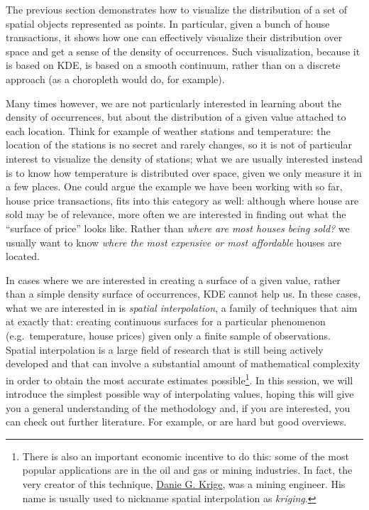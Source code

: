 \documentclass[]{book}
\begin{document}
The previous section demonstrates how to visualize the distribution of a
set of spatial objects represented as points. In particular, given a
bunch of house transactions, it shows how one can effectively visualize
their distribution over space and get a sense of the density of
occurrences. Such visualization, because it is based on KDE, is based on
a smooth continuum, rather than on a discrete approach (as a choropleth
would do, for example).

Many times however, we are not particularly interested in learning about
the density of occurrences, but about the distribution of a given value
attached to each location. Think for example of weather stations and
temperature: the location of the stations is no secret and rarely
changes, so it is not of particular interest to visualize the density of
stations; what we are usually interested instead is to know how
temperature is distributed over space, given we only measure it in a few
places. One could argue the example we have been working with so far,
house price transactions, fits into this category as well: although
where house are sold may be of relevance, more often we are interested
in finding out what the ``surface of price'' looks like. Rather than
\emph{where are most houses being sold?} we usually want to know
\emph{where the most expensive or most affordable} houses are located.

In cases where we are interested in creating a surface of a given value,
rather than a simple density surface of occurrences, KDE cannot help us.
In these cases, what we are interested in is \emph{spatial
interpolation}, a family of techniques that aim at exactly that:
creating continuous surfaces for a particular phenomenon
(e.g.~temperature, house prices) given only a finite sample of
observations. Spatial interpolation is a large field of research that is
still being actively developed and that can involve a substantial amount
of mathematical complexity in order to obtain the most accurate
estimates possible\footnote{There is also an important economic
  incentive to do this: some of the most popular applications are in the
  oil and gas or mining industries. In fact, the very creator of this
  technique, \href{https://en.wikipedia.org/wiki/Danie_G._Krige}{Danie
  G. Krige}, was a mining engineer. His name is usually used to nickname
  spatial interpolation as \emph{kriging}.}. In this session, we will
introduce the simplest possible way of interpolating values, hoping this
will give you a general understanding of the methodology and, if you are
interested, you can check out further literature. For example,
\citet{banerjee2014hierarchical} or \citet{cressie2015statistics} are
hard but good overviews.
\end{document}
